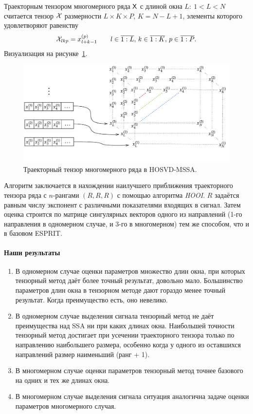 \documentclass[12pt]{article}
\theoremstyle{plain}
\theoremstyle{definition}
\theoremstyle{remark}
\newcommand{\HOOI}{\emph{HOOI}}
\begin{document}
Траекторным тензором многомерного ряда $\mathsf{X}$ с длиной окна $L:\: 1< L
< N$ считается тензор $\mathcal{X}$ размерности ${L \times K \times P}$,
${K = N - L + 1}$, элементы которого удовлетворяют равенству
\[
  \mathcal{X}_{lkp}=x_{l+k-1}^{(p)} \qquad l \in \overline{1:L},\, k \in
  \overline{1:K},\, p \in \overline{1:P}.
\]
Визуализация на рисунке~\ref{fig:traj-hosvd-mssa}.
\begin{figure}[!ht]
  \centering
  \includegraphics[width=\textwidth]{mssa_injection_new.pdf}
  \caption{Траекторный тензор многомерного ряда в HOSVD-MSSA.}
  \label{fig:traj-hosvd-mssa}
\end{figure}

Алгоритм заключается в нахождении наилучшего приближения траекторного
тензора ряда с $n$-рангами $(R, R, R)$ с помощью
алгоритма \HOOI{}.
$R$ задаётся равным числу экспонент с различными показателями входящих в сигнал.
Затем оценка строится по матрице сингулярных векторов одного из
направлений (1-го направления в одномерном случае, и 3-го в
многомерном) тем же способом, что и в базовом ESPRIT.

\pagebreak
\paragraph{Наши результаты}
\begin{enumerate}
  \item В одномерном случае оценки параметров множество длин окна,
    при которых тензорный метод даёт более точный результат, довольно мало.
    Большинство параметров длин окна в тензорном методе дают гораздо
    менее точный результат.
    Когда преимущество есть, оно невелико.
  \item В одномерном случае выделения сигнала тензорный метод не даёт
    преимущества над SSA ни при каких длинах окна.
    Наибольшей точности тензорный метод достигает при усечении
    траекторного тензора только по направлению наибольшего размера,
    особенно когда у одного из оставшихся направлений размер
    наименьший (ранг + 1).
  \item В многомерном случае оценки параметров тензорный метод точнее
    базового на одних и тех же длинах окна.
  \item В многомерном случае выделения сигнала ситуация аналогична
    задаче оценки параметров многомерного случая.
\end{enumerate}
\end{document}
